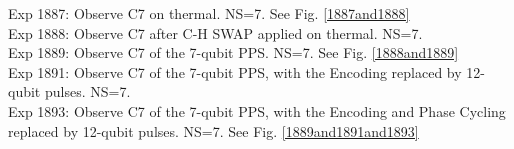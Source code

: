 Exp 1887: Observe C7 on thermal. NS=7. See Fig. \ref{1887and1888}\\
Exp 1888: Observe C7 after C-H SWAP applied on thermal. NS=7.\\
Exp 1889: Observe C7 of the 7-qubit PPS. NS=7. See Fig. \ref{1888and1889}\\
Exp 1891: Observe C7 of the 7-qubit PPS, with the Encoding replaced by 12-qubit pulses. NS=7.\\
Exp 1893: Observe C7 of the 7-qubit PPS, with the Encoding and Phase Cycling replaced by 12-qubit pulses. NS=7. See Fig. \ref{1889and1891and1893}\\
